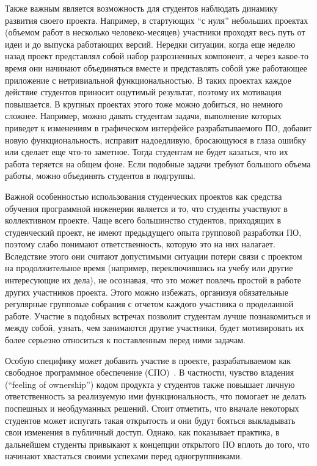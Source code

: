\documentclass[a4paper]{article}
\begin{document}
Также важным является возможность для студентов наблюдать динамику развития своего проекта. Например, в стартующих ``с нуля'' небольших проектах (объемом работ в несколько человеко-месяцев) участники проходят весь путь от идеи и до выпуска работающих версий. Нередки ситуации, когда еще неделю назад проект представлял собой набор разрозненных компонент, а через какое-то время они начинают объединяться вместе и представлять собой уже работающее приложение с нетривиальной функциональностью. В таких проектах каждое действие студентов приносит ощутимый результат, поэтому их мотивация повышается. В крупных проектах этого тоже можно добиться, но немного сложнее. Например, можно давать студентам задачи, выполнение которых приведет к изменениям в графическом интерфейсе разрабатываемого ПО, добавит новую функциональность, исправит надоедливую, бросающуюся в глаза ошибку или сделает еще что-то заметное. Тогда студентам не будет казаться, что их работа теряется на общем фоне. Если подобные задачи требуют большого объема работы, можно объединять студентов в подгруппы.

Важной особенностью использования студенческих проектов как средства обучения программной инженерии является и то, что студенты участвуют в коллективном проекте. Чаще всего большинство студентов, приходящих в студенческий проект, не имеют предыдущего опыта групповой разработки ПО, поэтому слабо понимают ответственность, которую это на них налагает. Вследствие этого они считают допустимыми ситуации потери связи с проектом на продолжительное время (например, переключившись на учебу или другие интересующие их дела), не осознавая, что это может повлечь простой в работе других участников проекта. Этого можно избежать, организуя обязательные регулярные групповые собрания с отчетом каждого участника о проделанной работе. Участие в подобных встречах позволит студентам лучше познакомиться и между собой, узнать, чем занимаются другие участники, будет мотивировать их более серьезно относиться к поставленным перед ними задачам.

Особую специфику может добавить участие в проекте, разрабатываемом как свободное программное обеспечение (СПО)~\cite{saratov}. В частности, чувство владения (``feeling of ownership'') кодом продукта у студентов также повышает личную ответственность за реализуемую ими функциональность, что помогает не делать поспешных и необдуманных решений. Стоит отметить, что вначале некоторых студентов может испугать такая открытость и они будут бояться выкладывать свои изменения в публичный доступ. Однако, как показывает практика, в дальнейшем студенты привыкают к концепции открытого ПО вплоть до того, что начинают хвастаться своими успехами перед одногруппниками.
\end{document}
